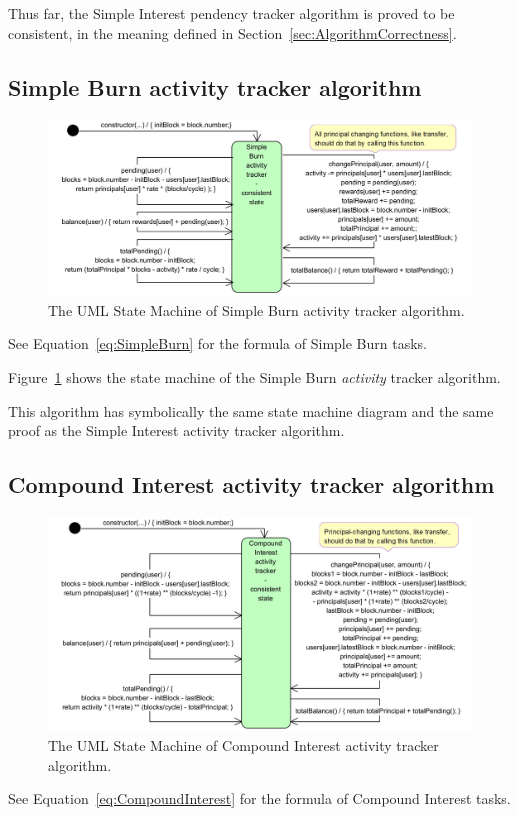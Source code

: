 \documentclass{article}
\begin{document}
Thus far, the Simple Interest pendency tracker algorithm is proved to be consistent, 
in the meaning defined in Section~\ref{sec:AlgorithmCorrectness}.

\subsection{Simple Burn activity tracker algorithm}
\label{sec:SimpleBurnActivity}

\begin{figure}[H]
  \centering
  \includegraphics[width=5.3in]{images/SimpleBurnActivity.jpg}
  \caption{The UML State Machine of Simple Burn activity tracker algorithm.}
  \label{fig:SimpleBurnActivity}
\end{figure}
See Equation~\ref{eq:SimpleBurn} for the formula of Simple Burn tasks.

Figure~\ref{fig:SimpleBurnActivity} shows the state machine of the Simple  
Burn \textit{activity} tracker algorithm.

This algorithm has symbolically the same state machine diagram and 
the same proof as the Simple Interest activity tracker algorithm.


\subsection{Compound Interest activity tracker algorithm}
\label{sec:CompoundInterestActivity}

\begin{figure}[H]
  \centering
  \includegraphics[width=5.3in]{images/CompoundInterestActivity.jpg}
  \caption{The UML State Machine of Compound Interest activity tracker algorithm.}
  \label{fig:CompoundInterestActivity}
\end{figure}
See Equation~\ref{eq:CompoundInterest} for the formula of Compound Interest tasks.
\end{document}
